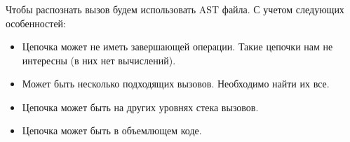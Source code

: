 \begin{frame}
\frametitle{\insertsection} 
\framesubtitle{\insertsubsection}
Чтобы распознать вызов будем использовать AST файла.
С учетом следующих особенностей:
\begin{itemize}
	\item Цепочка может не иметь завершающей операции. Такие цепочки нам не интересны (в них нет вычислений).
	\item Может быть несколько подходящих вызовов. Необходимо найти их все.
	\item Цепочка может быть на других уровнях стека вызовов.
	\item Цепочка может быть в объемлющем коде.
\end{itemize}
\end{frame}
